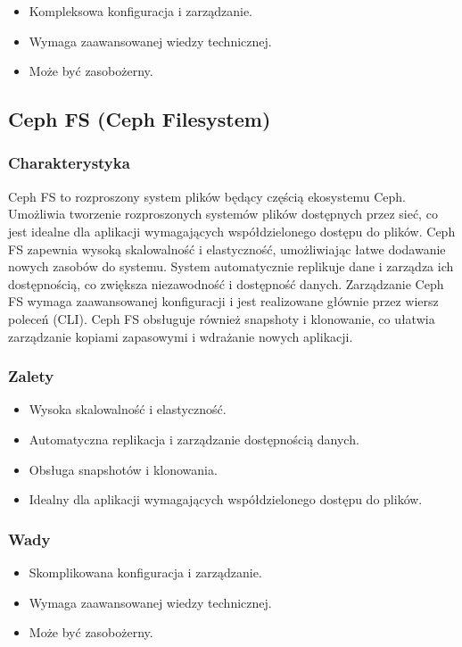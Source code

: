 \documentclass[polish,envcountsect,10pt]{article}
\begin{document}
\begin{itemize}
    \item Kompleksowa konfiguracja i zarządzanie.
    \item Wymaga zaawansowanej wiedzy technicznej.
    \item Może być zasobożerny.
\end{itemize}

\subsection{Ceph FS (Ceph Filesystem)}

\subsubsection{Charakterystyka}

Ceph FS to rozproszony system plików będący częścią ekosystemu Ceph. Umożliwia tworzenie rozproszonych systemów plików dostępnych przez sieć, co jest idealne dla aplikacji wymagających współdzielonego dostępu do plików. Ceph FS zapewnia wysoką skalowalność i elastyczność, umożliwiając łatwe dodawanie nowych zasobów do systemu. System automatycznie replikuje dane i zarządza ich dostępnością, co zwiększa niezawodność i dostępność danych. Zarządzanie Ceph FS wymaga zaawansowanej konfiguracji i jest realizowane głównie przez wiersz poleceń (CLI). Ceph FS obsługuje również snapshoty i klonowanie, co ułatwia zarządzanie kopiami zapasowymi i wdrażanie nowych aplikacji.

\subsubsection{Zalety}

\begin{itemize}
    \item Wysoka skalowalność i elastyczność.
    \item Automatyczna replikacja i zarządzanie dostępnością danych.
    \item Obsługa snapshotów i klonowania.
    \item Idealny dla aplikacji wymagających współdzielonego dostępu do plików.
\end{itemize}

\subsubsection{Wady}

\begin{itemize}
    \item Skomplikowana konfiguracja i zarządzanie.
    \item Wymaga zaawansowanej wiedzy technicznej.
    \item Może być zasobożerny.
\end{itemize}
\end{document}
